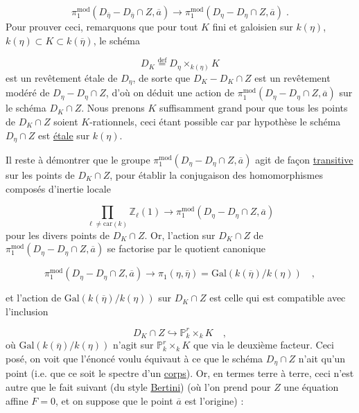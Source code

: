 \begin{equation}\tag{6.1.7.2}
\pi_1^{\mathrm{mod}}(D_{\overline{\eta}} - D_{\overline{\eta}} \cap Z, \overline{a}) \longrightarrow \pi_1^{\mathrm{mod}}(D_{\eta} - D_{\eta} \cap Z, \overline{a}) \; .
\end{equation}
Pour prouver ceci, remarquons que pour tout $K$ fini et galoisien sur $k(\eta)$, $k(\eta) \subset K \subset k(\overline{\eta})$, le schéma

\begin{equation*}
D_K \stackrel{\mathrm{def}}{=} D_{\eta} \times_{k(\eta)} K
\end{equation*}
est un revêtement étale de $D_{\eta}$, de sorte que $D_K - D_K \cap Z$ est un revêtement modéré de $D_{\eta} - D_{\eta} \cap Z$, d'où on déduit une action de $\pi_1^{\mathrm{mod}}(D_{\eta} - D_{\eta} \cap Z, \overline{a})$ sur le schéma $D_K \cap Z$. Nous prenons $K$ suffisamment grand pour que tous les points de $D_K \cap Z$ soient $K$-rationnels, ceci étant possible car par hypothèse le schéma $D_{\eta} \cap Z$ est \underline{étale} sur $k(\eta)$.

Il reste à démontrer que le groupe $\pi_1^{\mathrm{mod}}(D_{\eta}-D_{\eta} \cap Z, \overline{a})$ agit de façon \underline{transitive} sur les points de $D_K \cap Z$, pour établir la conjugaison des homomorphismes composés d'inertie locale

\begin{equation*}
\prod_{\ell \neq \mathrm{car}(k)} \mathbb{Z}_{\ell}(1) \longrightarrow \pi_1^{\mathrm{mod}}(D_{\eta} - D_{\eta} \cap Z, \overline{a})
\end{equation*}
pour les divers points de $D_K \cap Z$. Or, l'action sur $D_K \cap Z$ de $\pi_1^{\mathrm{mod}}(D_{\eta} - D_{\eta} \cap Z, \overline{a})$ se factorise par le quotient canonique

\begin{equation*}
\pi_1^{\mathrm{mod}}(D_{\eta} - D_{\eta} \cap Z, \overline{a}) \longrightarrow \pi_1(\eta, \overline{\eta}) = \mathrm{Gal}(k(\overline{\eta})/k(\eta)) \quad ,
\end{equation*}


et l'action de $\mathrm{Gal}(k(\overline{\eta})/k(\eta))$ sur $D_K \cap Z$ est celle qui est compatible avec l'inclusion

\begin{equation*}
D_K \cap Z \hookrightarrow \mathbb{P}^r_k \times_k K \quad ,
\end{equation*}
où $\mathrm{Gal}(k(\overline{\eta})/k(\eta))$ n'agit sur $\mathbb{P}^r_k \times_k K$ que via le deuxième facteur. Ceci posé, on voit que l'énoncé voulu équivaut à ce que le schéma $D_{\eta} \cap Z$ n'ait qu'un point (i.e. que ce soit le spectre d'un \underline{corps}). Or, en termes terre à terre, ceci n'est autre que le fait suivant (du style \underline{Bertini}) (où l'on prend pour $Z$ une équation affine $F = 0$, et on suppose que le point $\overline{a}$ est l'origine) :

